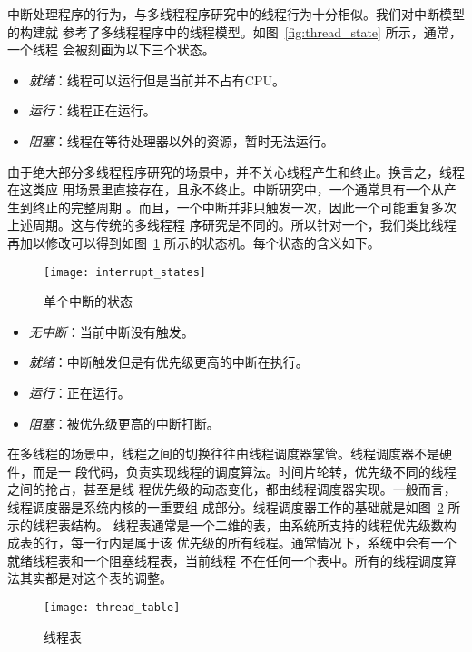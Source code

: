 中断处理程序的行为，与多线程程序研究中的线程行为十分相似。我们对中断模型的构建就
参考了多线程程序中的线程模型。如图~\ref{fig:thread_state} 所示，通常，一个线程
会被刻画为以下三个状态。
\begin{itemize}
	\item \emph{就绪}：线程可以运行但是当前并不占有CPU。
	\item \emph{运行}：线程正在运行。
	\item \emph{阻塞}：线程在等待处理器以外的资源，暂时无法运行。
\end{itemize}

由于绝大部分多线程程序研究的场景中，并不关心线程产生和终止。换言之，线程在这类应
用场景里直接存在，且永不终止。中断研究中，一个通常具有一个从产生到终止的完整周期
。而且，一个中断并非只触发一次，因此一个可能重复多次上述周期。这与传统的多线程程
序研究是不同的。所以针对一个，我们类比线程再加以修改可以得到如图~\ref{fig:interrupt_state} 
所示的状态机。每个状态的含义如下。

\begin{figure}[H]
	\centering
	\texttt{[image: interrupt\_states]}
	\caption{单个中断的状态}
	\label{fig:interrupt_state}
\end{figure}

\begin{itemize}
	\item \emph{无中断}：当前中断没有触发。
	\item \emph{就绪}：中断触发但是有优先级更高的中断在执行。
	\item \emph{运行}：正在运行。
	\item \emph{阻塞}：被优先级更高的中断打断。
\end{itemize}

在多线程的场景中，线程之间的切换往往由线程调度器掌管。线程调度器不是硬件，而是一
段代码，负责实现线程的调度算法。时间片轮转，优先级不同的线程之间的抢占，甚至是线
程优先级的动态变化，都由线程调度器实现。一般而言，线程调度器是系统内核的一重要组
成部分。线程调度器工作的基础就是如图~\ref{fig:thread_table} 所示的线程表结构。
线程表通常是一个二维的表，由系统所支持的线程优先级数构成表的行，每一行内是属于该
优先级的所有线程。通常情况下，系统中会有一个就绪线程表和一个阻塞线程表，当前线程
不在任何一个表中。所有的线程调度算法其实都是对这个表的调整。

\begin{figure}[H]
	\centering
	\texttt{[image: thread\_table]}
	\caption{线程表}
	\label{fig:thread_table}
\end{figure}

